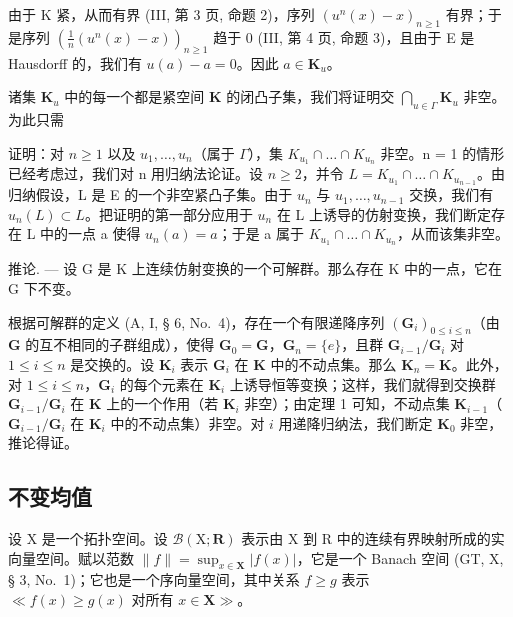 由于 K 紧，从而有界 (III, 第 3 页, 命题 2)，序列 \((u^n(x) - x)_{n\geqslant 1}\) 有界；于是序列 \(\left(\frac{1}{n} (u^n (x) - x)\right)_{n\geqslant 1}\) 趋于 0 (III, 第 4 页, 命题 3)，且由于 E 是 Hausdorff 的，我们有 \(u(a) - a = 0\)。因此 \(a\in \mathbf{K}_u\)。

诸集 \(\mathbf{K}_u\) 中的每一个都是紧空间 \(\mathbf{K}\) 的闭凸子集，我们将证明交 \(\bigcap_{u\in \Gamma}\mathbf{K}_u\) 非空。为此只需

证明：对 \(n \geqslant 1\) 以及 \(u_{1}, \ldots, u_{n}\)（属于 \(\Gamma\)），集 \(K_{u_{1}} \cap \ldots \cap K_{u_{n}}\) 非空。n = 1 的情形已经考虑过，我们对 n 用归纳法论证。设 \(n \geqslant 2\)，并令 \(L = K_{u_{1}} \cap \ldots \cap K_{u_{n-1}}\)。由归纳假设，L 是 E 的一个非空紧凸子集。由于 \(u_{n}\) 与 \(u_{1}, \ldots, u_{n-1}\) 交换，我们有 \(u_{n}(L) \subset L\)。把证明的第一部分应用于 \(u_{n}\) 在 L 上诱导的仿射变换，我们断定存在 L 中的一点 a 使得 \(u_{n}(a) = a\)；于是 a 属于 \(K_{u_{1}} \cap \ldots \cap K_{u_{n}}\)，从而该集非空。

推论. --- 设 G 是 K 上连续仿射变换的一个可解群。那么存在 K 中的一点，它在 G 下不变。

根据可解群的定义 (A, I, § 6, No.~4)，存在一个有限递降序列 \((\mathbf{G}_i)_{0\leqslant i\leqslant n}\)（由 \(\mathbf{G}\) 的互不相同的子群组成），使得 \(\mathbf{G}_0 = \mathbf{G}\)，\(\mathbf{G}_n = \{e\}\)，且群 \(\mathbf{G}_{i - 1} / \mathbf{G}_i\) 对 \(1\leqslant i\leqslant n\) 是交换的。设 \(\mathbf{K}_i\) 表示 \(\mathbf{G}_i\) 在 \(\mathbf{K}\) 中的不动点集。那么 \(\mathbf{K}_n = \mathbf{K}\)。此外，对 \(1\leqslant i\leqslant n\)，\(\mathbf{G}_i\) 的每个元素在 \(\mathbf{K}_i\) 上诱导恒等变换；这样，我们就得到交换群 \(\mathbf{G}_{i - 1} / \mathbf{G}_i\) 在 \(\mathbf{K}\) 上的一个作用（若 \(\mathbf{K}_i\) 非空）；由定理 1 可知，不动点集 \(\mathbf{K}_{i - 1}\)（\(\mathbf{G}_{i - 1} / \mathbf{G}_i\) 在 \(\mathbf{K}_i\) 中的不动点集）非空。对 \(i\) 用递降归纳法，我们断定 \(\mathbf{K}_0\) 非空，推论得证。

\subsection{不变均值}

设 X 是一个拓扑空间。设 \(\mathcal{B}(\mathrm{X};\mathbf{R})\) 表示由 X 到 R 中的连续有界映射所成的实向量空间。赋以范数 \(\| f\| = \sup_{x\in \mathbf{X}}|f(x)|\)，它是一个 Banach 空间 (GT, X, § 3, No.~1)；它也是一个序向量空间，其中关系 \(f\geqslant g\) 表示 \(\ll f(x)\geqslant g(x) \text{ 对所有 } x\in \mathbf{X}\gg\)。


